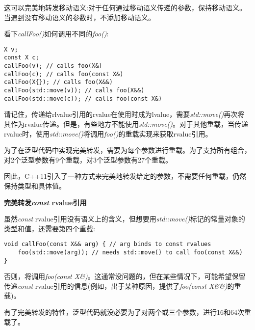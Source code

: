 这可以完美地转发移动语义:对于任何通过移动语义传递的参数，保持移动语义。当遇到没有移动语义的参数时，不添加移动语义。\par

看下\textit{callFoo()}如何调用不同的\textit{foo()}:\par

\begin{lstlisting}[caption={}]
X v;
const X c;
callFoo(v); // calls foo(X&)
callFoo(c); // calls foo(const X&)
callFoo(X{}); // calls foo(X&&)
callFoo(std::move(v)); // calls foo(X&&)
callFoo(std::move(c)); // calls foo(const X&)
\end{lstlisting}

请记住，传递给rlvalue引用的rvalue在使用时成为lvalue，需要\textit{std::move()}再次将其作为rvalue传递。但是，有些地方不能使用\textit{std::move()}。对于其他重载，当传递rvalue时，使用\textit{std::move()}将调用\textit{foo()}的重载实现来获取rvalue引用。\par

为了在泛型代码中实现完美转发，需要为每个参数进行重载。为了支持所有组合，对2个泛型参数有9个重载，对3个泛型参数有27个重载。\par

因此，C++11引入了一种方式来完美地转发给定的参数，不需要任何重载，仍然保持类型和具体值。\par

\hspace*{\fill} \par %
\textbf{完美转发\textit{const} rvalue引用}

虽然\textit{const} rvalue引用没有语义上的含义，但想要用\textit{std::move()}标记的常量对象的类型和值，还需要第四个重载:\par

\begin{lstlisting}[caption={}]
void callFoo(const X&& arg) { // arg binds to const rvalues
	foo(std::move(arg)); // needs std::move() to call foo(const X&&)
}
\end{lstlisting}

否则，将调用\textit{foo(const X\&)}。这通常没问题的，但在某些情况下，可能希望保留传递\textit{const} rvalue引用的信息(例如，出于某种原因，提供了\textit{foo(const X\&\&)}的重载)。\par

有了完美转发的特性，泛型代码就没必要为了对两个或三个参数，进行16和64次重载了。\par


















